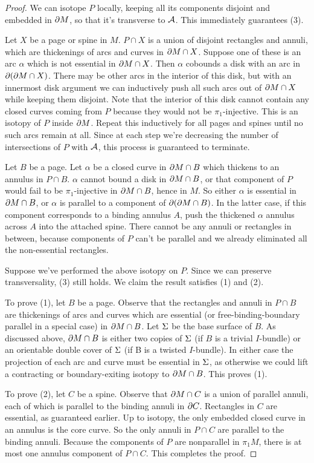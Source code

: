 \begin{proof}

We can isotope $P$ locally, keeping all its components disjoint and embedded in
$\partial M$, so that it's transverse to $\mathcal{A}$. This immediately guarantees (3).

Let $X$ be a page or spine in $M$. $P \cap X$ is a union of disjoint rectangles
and annuli, which are thickenings of arcs and curves in $\partial M \cap X$. Suppose
one of these is an arc $\alpha$ which is not essential in $\partial M \cap X$. Then
$\alpha$ cobounds a disk with an arc in $\partial (\partial M \cap X)$. There may be
other arcs in the interior of this disk, but with an innermost disk argument we
can inductively push all such arcs out of $\partial M \cap X$ while keeping them
disjoint.  Note that the interior of this disk cannot contain any closed curves
coming from $P$ because they would not be $\pi_1$-injective. This is an isotopy
of $P$ inside $\partial M$.  Repeat this inductively for all pages and spines until
no such arcs remain at all.  Since at each step we're decreasing the number of
intersections of $P$ with $\mathcal{A}$, this process is guaranteed to terminate.

Let $B$ be a page. Let $\alpha$ be a closed curve in $\partial M \cap B$ which
thickens to an annulus in $P \cap B$. $\alpha$ cannot bound a disk in $\partial
M \cap B$, or that component of $P$ would fail to be $\pi_1$-injective in $\partial
M \cap B$, hence in $M$. So either $\alpha$ is essential in $\partial M \cap B$, or
$\alpha$ is parallel to a component of $\partial(\partial M \cap B)$. In the latter case,
if this component corresponds to a binding annulus $A$, push the thickened
$\alpha$ annulus across $A$ into the attached spine.  There cannot be any
annuli or rectangles in between, because components of $P$ can't be parallel
and we already eliminated all the non-essential rectangles.

Suppose we've performed the above isotopy on $P$. Since we can preserve
transversality, (3) still holds. We claim the result satisfies (1) and (2).

To prove (1), let $B$ be a page. Observe that the rectangles and annuli in $P
\cap B$ are thickenings of arcs and curves which are essential (or
free-binding-boundary parallel in a special case) in $\partial M \cap B$. Let $\Sigma$
be the base surface of $B$. As discussed above, $\partial M \cap B$ is either two
copies of $\Sigma$ (if $B$ is a trivial $I$-bundle) or an orientable double cover
of $\Sigma$ (if B is a twisted $I$-bundle). In either case the projection of each
arc and curve must be essential in $\Sigma$, as otherwise we could lift
a contracting or boundary-exiting isotopy to $\partial M \cap B$. This proves (1).

To prove (2), let $C$ be a spine. Observe that $\partial M \cap C$ is a union of
parallel annuli, each of which is parallel to the binding annuli in $\partial C$.
Rectangles in $C$ are essential, as guaranteed earlier. Up to isotopy, the only
embedded closed curve in an annulus is the core curve. So the only annuli in $P
\cap C$ are parallel to the binding annuli. Because the components of $P$ are
nonparallel in $\pi_1M$, there is at most one annulus component of $P\cap C$.
This completes the proof.

\end{proof}

